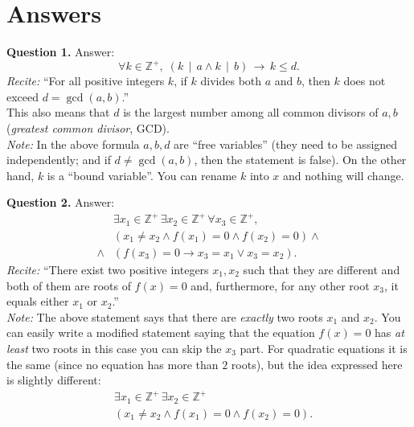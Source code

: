 \documentclass[jou]{apa6}
\begin{document}
\newpage 

\section{Answers}


{\bf Question 1.} Answer:
$$\boxed{\forall k \in \mathbb{Z}^{+},\;\left(k\,\mid\,a \wedge 
k\,\mid\,b\right)\,\rightarrow\,k \leq d.}$$
{\em Recite:} ``For all positive integers $k$, if $k$ divides 
both $a$ and $b$, then $k$ does not exceed 
$d = \operatorname{gcd}(a,b)$.''\\
This also means that $d$ is the largest number among all
common divisors of $a,b$ ({\em greatest common divisor}, GCD).\\
{\em Note:} In the above formula $a,b,d$ are ``free variables''
(they need to be assigned independently; and if 
$d \neq \operatorname{gcd}(a,b)$, then the statement is false). 
On the other hand, $k$ is a ``bound variable''. You can rename
$k$ into $x$ \textendash{} and nothing will change.

\vspace{10pt}
{\bf Question 2.} Answer:
\begin{align}
 & \exists x_1 \in \mathbb{Z}^{+}\,\exists x_2 \in \mathbb{Z}^{+}\,
\forall x_3 \in \mathbb{Z}^{+}, \nonumber \\
 & \left( x_1 \neq x_2 \wedge f(x_1)=0 \wedge f(x_2) = 0 \right) \wedge \nonumber \\
\wedge & \left( f(x_3) = 0 \rightarrow x_3 = x_1 \vee x_3 = x_2 \right). 
\nonumber
\end{align}
{\em Recite:} ``There exist two positive integers $x_1,x_2$ 
such that they are different and 
both of them are roots of $f(x)=0$ and, 
furthermore, for any other root $x_3$, it 
equals either $x_1$ or $x_2$.''\\
{\em Note:} The above statement says that there are {\em exactly}
two roots $x_1$ and $x_2$. You can easily write a modified statement 
saying that the equation $f(x)=0$ has {\em at least} two roots \textendash{}
in this case you can skip the $x_3$ part. For quadratic equations it
is the same (since no equation has more than $2$ roots), but 
the idea expressed here is slightly different:
\begin{align}
 & \exists x_1 \in \mathbb{Z}^{+}\,\exists x_2 \in \mathbb{Z}^{+} \nonumber \\
 & \left( x_1 \neq x_2 \wedge f(x_1)=0 \wedge f(x_2) = 0 \right). \nonumber 
\end{align}
\end{document}

